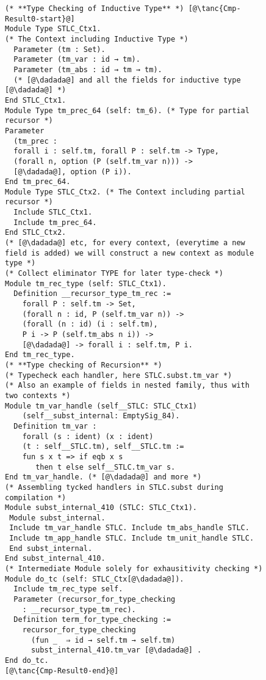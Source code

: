 \begin{figure}

\begin{minipage}{\textwidth}
\begin{multicols}{2}




\begin{lstlisting}
(* **Type Checking of Inductive Type** *) [@\tanc{Cmp-Result0-start}@]
Module Type STLC_Ctx1. 
(* The Context including Inductive Type *)
  Parameter (tm : Set).
  Parameter (tm_var : id → tm).
  Parameter (tm_abs : id → tm → tm).
  (* [@\dadada@] and all the fields for inductive type [@\dadada@] *)
End STLC_Ctx1.
Module Type tm_prec_64 (self: tm_6). (* Type for partial recursor *)
Parameter
  (tm_prec :
  forall i : self.tm, forall P : self.tm -> Type,
  (forall n, option (P (self.tm_var n))) ->
  [@\dadada@], option (P i)).
End tm_prec_64.
Module Type STLC_Ctx2. (* The Context including partial recursor *) 
  Include STLC_Ctx1.
  Include tm_prec_64.
End STLC_Ctx2.
(* [@\dadada@] etc, for every context, (everytime a new field is added) we will construct a new context as module type *)
(* Collect eliminator TYPE for later type-check *)
Module tm_rec_type (self: STLC_Ctx1).
  Definition __recursor_type_tm_rec :=
    forall P : self.tm -> Set,
    (forall n : id, P (self.tm_var n)) ->
    (forall (n : id) (i : self.tm),
    P i -> P (self.tm_abs n i)) ->
    [@\dadada@] -> forall i : self.tm, P i.
End tm_rec_type.  
(* **Type checking of Recursion** *)
(* Typecheck each handler, here STLC.subst.tm_var *)
(* Also an example of fields in nested family, thus with two contexts *) 
Module tm_var_handle (self__STLC: STLC_Ctx1)
    (self__subst_internal: EmptySig_84).
  Definition tm_var :
    forall (s : ident) (x : ident) 
    (t : self__STLC.tm), self__STLC.tm :=
    fun s x t => if eqb x s
       then t else self__STLC.tm_var s.
End tm_var_handle. (* [@\dadada@] and more *)
(* Assembling tycked handlers in STLC.subst during compilation *)
Module subst_internal_410 (STLC: STLC_Ctx1). 
 Module subst_internal.
 Include tm_var_handle STLC. Include tm_abs_handle STLC.
 Include tm_app_handle STLC. Include tm_unit_handle STLC.
 End subst_internal.
End subst_internal_410.
(* Intermediate Module solely for exhausitivity checking *) 
Module do_tc (self: STLC_Ctx[@\dadada@]).
  Include tm_rec_type self.
  Parameter (recursor_for_type_checking 
    : __recursor_type_tm_rec).
  Definition term_for_type_checking :=
    recursor_for_type_checking 
      (fun _  ⇒ id → self.tm → self.tm)
      subst_internal_410.tm_var [@\dadada@] .
End do_tc.
[@\tanc{Cmp-Result0-end}@]
\end{lstlisting}


\end{multicols}
\end{minipage}
\end{figure}

